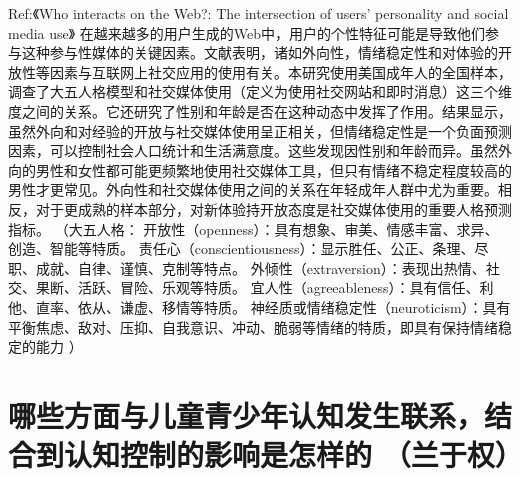 Ref:《Who interacts on the Web?: The intersection of users’ personality and social media use》
在越来越多的用户生成的Web中，用户的个性特征可能是导致他们参与这种参与性媒体的关键因素。文献表明，诸如外向性，情绪稳定性和对体验的开放性等因素与互联网上社交应用的使用有关。本研究使用美国成年人的全国样本，调查了大五人格模型和社交媒体使用（定义为使用社交网站和即时消息）这三个维度之间的关系。它还研究了性别和年龄是否在这种动态中发挥了作用。结果显示，虽然外向和对经验的开放与社交媒体使用呈正相关，但情绪稳定性是一个负面预测因素，可以控制社会人口统计和生活满意度。这些发现因性别和年龄而异。虽然外向的男性和女性都可能更频繁地使用社交媒体工具，但只有情绪不稳定程度较高的男性才更常见。外向性和社交媒体使用之间的关系在年轻成年人群中尤为重要。相反，对于更成熟的样本部分，对新体验持开放态度是社交媒体使用的重要人格预测指标。
（大五人格：
开放性（openness）：具有想象、审美、情感丰富、求异、创造、智能等特质。
责任心（conscientiousness）：显示胜任、公正、条理、尽职、成就、自律、谨慎、克制等特点。
外倾性（extraversion）：表现出热情、社交、果断、活跃、冒险、乐观等特质。
宜人性（agreeableness）：具有信任、利他、直率、依从、谦虚、移情等特质。
神经质或情绪稳定性（neuroticism）：具有平衡焦虑、敌对、压抑、自我意识、冲动、脆弱等情绪的特质，即具有保持情绪稳定的能力
）


\section{哪些方面与儿童青少年认知发生联系，结合到认知控制的影响是怎样的  %
（兰于权）%
}

